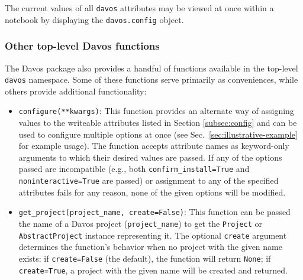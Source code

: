 \documentclass[preprint,12pt,a4paper]{elsarticle}
\begin{document}
\noindent The current values of all \texttt{davos} attributes may be viewed at once within a notebook by displaying the \texttt{davos.config} object.


\subsubsection{Other top-level Davos functions}\label{subsec:toplevel}

The Davos package also provides a handful of functions available in the top-level \texttt{davos} namespace.
Some of these functions serve primarily as conveniences, while others provide additional functionality:

\begin{itemize}

\item \texttt{configure(**kwargs)}: This function provides an alternate way of assigning values to the writeable attributes listed in Section \ref{subsec:config} and can be used to configure multiple options at once (see Sec.~\ref{sec:illustrative-example} for example usage).
  The function accepts attribute names as keyword-only arguments to which their desired values are passed.
  If any of the options passed are incompatible (e.g., both \texttt{confirm\_install=True} and \texttt{noninteractive=True} are passed) or assignment to any of the specified attributes fails for any reason, none of the given options will be modified.

\item \texttt{get\_project(project\_name, create=False)}: This function can be passed the name of a Davos project (\texttt{project\_name}) to get the \texttt{Project} or \texttt{AbstractProject} instance representing it.
  The optional \texttt{create} argument determines the function's behavior when no project with the given name exists: if \texttt{create=False} (the default), the function will return \texttt{None}; if \texttt{create=True}, a project with the given name will be created and returned.


\end{itemize}
\end{document}
